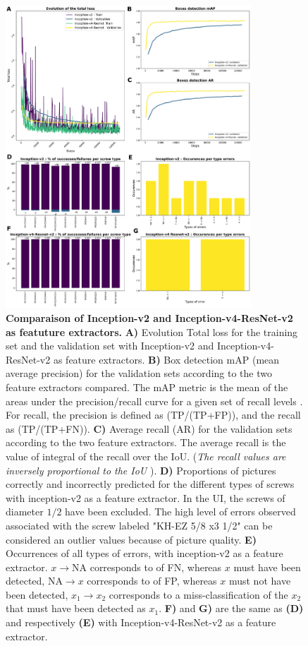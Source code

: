 \documentclass[12pt, french, a4paper]{article} %
\begin{document}
\begin{figure}[H]
 \centering
 \includegraphics[width=0.82\textwidth]{figure/res_inception_resnet.pdf}
 \caption{\textbf{Comparaison of Inception-v2 and Inception-v4-ResNet-v2 as featuture extractors.} \textbf{A)} Evolution Total loss for the training set and the validation set with Inception-v2 and Inception-v4-ResNet-v2 as feature extractors. \textbf{B)} Box detection \gls{mAP} (mean average precision) for the validation sets according to the two feature extractors compared. The \gls{mAP} metric is the mean of the areas under the precision/recall curve for a given set of recall levels \cite{everingham2011pascal}. For recall, the precision is defined as (\gls{TP}/(\gls{TP}+\gls{FP})), and the recall as (\gls{TP}/(\gls{TP}+\gls{FN})). \textbf{C)} Average recall (\gls{AR}) for the validation sets according to the two feature extractors. The average recall is the value of integral of the recall over the \gls{IoU}. (\textit{The recall values are inversely proportional to the \gls{IoU} }). \textbf{D)} Proportions of pictures correctly and incorrectly predicted for the different types of screws with inception-v2 as a feature extractor. In the \gls{UI}, the screws of diameter $1/2$ have been excluded. The high level of errors observed associated with the screw labeled "KH-EZ 5/8 x3 1/2" can be considered an outlier values because of picture quality. \textbf{E)} Occurrences of all types of errors, with inception-v2 as a feature extractor. $x \rightarrow \text{NA}$ corresponds to of \gls{FN}, whereas $x$ must have been detected, $ \text{NA} \rightarrow x$ corresponds to of \gls{FP}, whereas $x$ must not have been detected, $x_1 \rightarrow x_2$ corresponds to a miss-classification of the $x_2$ that must have been detected as $x_1$. \textbf{F)} and \textbf{G)} are the same as \textbf{(D)} and respectively \textbf{(E)} with Inception-v4-ResNet-v2 as a feature extractor.}
 \label{comp_inception_ResNet}
\end{figure}
\end{document}
